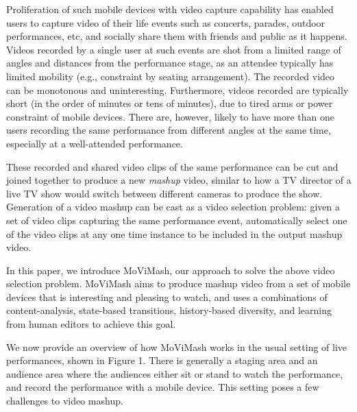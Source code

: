 \documentclass{new}
\begin{document}
Proliferation of such mobile devices with video capture capability
has enabled users to capture video of their life events such
as concerts, parades, outdoor performances, etc, and socially share
them with friends and public as it happens. Videos recorded by
a single user at such events are shot from a limited range of angles
and distances from the performance stage, as an attendee typically
has limited mobility (e.g., constraint by seating arrangement).
The recorded video can be monotonous and uninteresting. Furthermore,
videos recorded are typically short (in the order of minutes
or tens of minutes), due to tired arms or power constraint of mobile
devices. There are, however, likely to have more than one users
recording the same performance from different angles at the same
time, especially at a well-attended performance.

These recorded and shared video clips of the same performance
    can be cut and joined together to produce a new \textit{mashup} video,
similar to how a TV director of a live TV show would switch between
different cameras to produce the show. Generation of a video
mashup can be cast as a video selection problem: given a set of
video clips capturing the same performance event, automatically
select one of the video clips at any one time instance to be included
in the output mashup video.

In this paper, we introduce MoViMash, our approach to solve
the above video selection problem. MoViMash aims to produce
mashup video from a set of mobile devices that is interesting and
pleasing to watch, and uses a combinations of content-analysis,
state-based transitions, history-based diversity, and learning from
human editors to achieve this goal.

We now provide an overview of how MoViMash works in the
usual setting of live performances, shown in Figure 1. There is
generally a staging area and an audience area where the audiences
either sit or stand to watch the performance, and record the performance
with a mobile device. This setting poses a few challenges to
video mashup.
\end{document}
